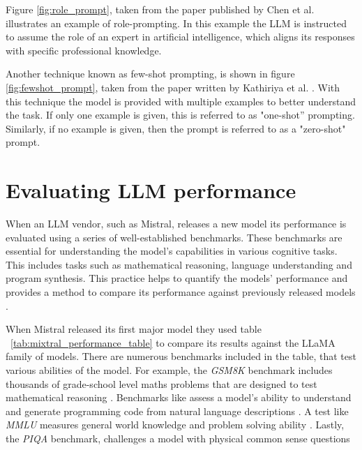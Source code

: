 Figure \ref{fig:role_prompt}, taken from the paper published by Chen et al. \cite{chen_unleashing_2023} illustrates an example of role-prompting. In this example the \gls{LLM} is instructed to assume the role of an expert in artificial intelligence, which aligns its responses with specific professional knowledge.





Another technique known as few-shot prompting, is shown in figure \ref{fig:fewshot_prompt}, taken from the paper written by Kathiriya et al. \cite{kathiriya_power_2023}. With this technique the model is provided with multiple examples to better understand the task. If only one example is given, this is referred to as "one-shot” prompting. Similarly, if no example is given, then the prompt is referred to as a "zero-shot" prompt.





\section{Evaluating LLM performance}


When an \gls{LLM} vendor, such as Mistral, releases a new model its performance is evaluated using a series of well-established benchmarks. These benchmarks are essential for understanding the model’s capabilities in various cognitive tasks. This includes tasks such as mathematical reasoning, language understanding and program synthesis. This practice helps to quantify the models' performance and provides a method to compare its performance against previously released models \cite{cobbe_training_2021, austin_program_2021, chen_evaluating_2021}.


When Mistral released its first major model they used table ~\ref{tab:mixtral_performance_table} to compare its results against the LLaMA family of models. There are numerous benchmarks included in the table, that test various abilities of the model. For example, the \textit{GSM8K} benchmark includes thousands of grade-school level maths problems that are designed to test mathematical reasoning \cite{cobbe_training_2021}. Benchmarks like  assess a model's ability to understand and generate programming code from natural language descriptions \cite{austin_program_2021}. A test like \textit{MMLU} measures general world knowledge and problem solving ability \cite{hendrycks_measuring_2020}. Lastly, the \textit{PIQA} benchmark, challenges a model with physical common sense questions \cite{bisk_piqa_2020}



